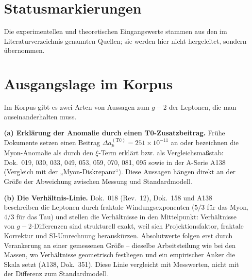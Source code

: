 \section*{Statusmarkierungen}

Die experimentellen und theoretischen Eingangswerte stammen aus den im
Literaturverzeichnis genannten Quellen; sie werden hier nicht hergeleitet, sondern
übernommen.

\section{Ausgangslage im Korpus}
Im Korpus gibt es zwei Arten von Aussagen zum $g-2$ der Leptonen, die man
auseinanderhalten muss.

\textbf{(a) Erklärung der Anomalie durch einen T0-Zusatzbeitrag.} Frühe Dokumente
setzen einen Beitrag $\Delta a_\mu^{(\mathrm{T0})}=251\times10^{-11}$ an oder
bezeichnen die Myon-Anomalie als durch den $\xi$-Term erklärt bzw. als
Vergleichsmaßstab: Dok.~019, 030, 033, 049, 053, 059, 070, 081, 095 sowie in der
A-Serie A138 (Vergleich mit der „Myon-Diskrepanz``). Diese Aussagen hängen direkt an
der Größe der Abweichung zwischen Messung und Standardmodell.

\textbf{(b) Die Verhältnis-Linie.} Dok.~018 (Rev.~12), Dok.~158 und A138 beschreiben
die Leptonen durch fraktale Windungsexponenten ($5/3$ für das Myon, $4/3$ für das Tau)
und stellen die Verhältnisse in den Mittelpunkt: Verhältnisse von $g-2$-Differenzen
sind strukturell exakt, weil sich Projektionsfaktor, fraktale Korrektur und
SI-Umrechnung herauskürzen. Absolutwerte folgen erst durch Verankerung an einer
gemessenen Größe -- dieselbe Arbeitsteilung wie bei den Massen, wo Verhältnisse
geometrisch festliegen und ein empirischer Anker die Skala setzt (A138, Dok.~351).
Diese Linie vergleicht mit Messwerten, nicht mit der Differenz zum Standardmodell.

